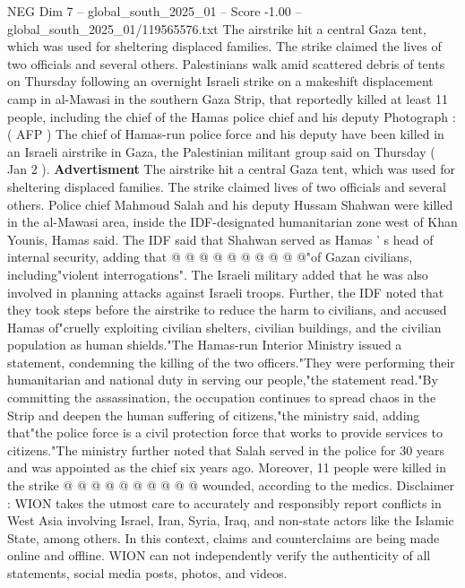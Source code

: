 \begin{textsample}{NEG Dim 7 – global\_south\_2025\_01 – Score -1.00 – global\_south\_2025\_01/119565576.txt}  \label{ex:f7_neg_116}
The airstrike hit a central Gaza tent, which was used for sheltering displaced families.
The strike claimed the lives of two officials and several others.
Palestinians walk amid scattered debris of tents on Thursday following an overnight Israeli strike on a makeshift displacement camp in al-Mawasi in the southern Gaza Strip, that reportedly killed at least 11 people, including the chief of the Hamas police chief and his deputy Photograph : ( AFP ) The chief of Hamas-run police force and his deputy have been killed in an Israeli airstrike in Gaza, the Palestinian militant group said on Thursday ( Jan 2 ). \textbf{Advertisment} The airstrike hit a central Gaza tent, which was used for sheltering displaced families.
The strike claimed lives of two officials and several others.
Police chief Mahmoud Salah and his deputy Hussam Shahwan were killed in the al-Mawasi area, inside the IDF-designated humanitarian zone west of Khan Younis, Hamas said.
The IDF said that Shahwan served as Hamas ' s head of internal security, adding that @ @ @ @ @ @ @ @ @ @"of Gazan civilians, including"violent interrogations".
The Israeli military added that he was also involved in planning attacks against Israeli troops.
Further, the IDF noted that they took steps before the airstrike to reduce the harm to civilians, and accused Hamas of"cruelly exploiting civilian shelters, civilian buildings, and the civilian population as human shields."The Hamas-run Interior Ministry issued a statement, condemning the killing of the two officers."They were performing their humanitarian and national duty in serving our people,"the statement read."By committing the assassination, the occupation continues to spread chaos in the Strip and deepen the human suffering of citizens,"the ministry said, adding that"the police force is a civil protection force that works to provide services to citizens."The ministry further noted that Salah served in the police for 30 years and was appointed as the chief six years ago.
Moreover, 11 people were killed in the strike @ @ @ @ @ @ @ @ @ @ wounded, according to the medics.
Disclaimer : WION takes the utmost care to accurately and responsibly report conflicts in West Asia involving Israel, Iran, Syria, Iraq, and non-state actors like the Islamic State, among others.
In this context, claims and counterclaims are being made online and offline.
WION can not independently verify the authenticity of all statements, social media posts, photos, and videos.

\end{textsample}
